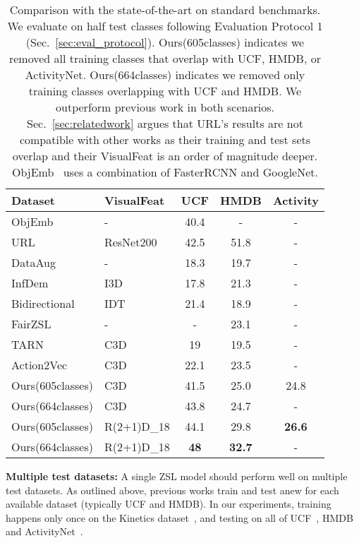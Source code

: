 \documentclass[10pt,twocolumn,letterpaper]{article}
\begin{document}
\begin{table}[t]
    \setlength{\tabcolsep}{2pt}
    \centering
    \begin{tabular}{llccc}  
    \toprule
    Dataset & VisualFeat & UCF & HMDB & Activity \\
    \toprule
    ObjEmb~\cite{mettes2017} & - & 40.4 & - & - \\
    URL~\cite{uar} & ResNet200 & 42.5 & 51.8 & - \\
    \midrule
    DataAug~\cite{xu2016multi} & - & 18.3 & 19.7 & -  \\
    InfDem~\cite{roitberg2018informed} & I3D & 17.8 & 21.3 & - \\
    Bidirectional~\cite{wang2017zero} & IDT & 21.4 & 18.9 & - \\
    FairZSL~\cite{roitberg2018towards} & - & - & 23.1 & - \\
    TARN~\cite{tarn} & C3D & 19 & 19.5 & - \\
    Action2Vec~\cite{action2vec} & C3D & 22.1 & 23.5 & - \\
    \midrule
    Ours(605classes) & C3D & 41.5 & 25.0 & 24.8 \\
    Ours(664classes) & C3D & 43.8 & 24.7 & - \\
    Ours(605classes) & R(2+1)D\_18 &44.1 & 29.8 & \textbf{26.6} \\
    Ours(664classes) & R(2+1)D\_18 & \textbf{48} & \textbf{32.7} & - \\
    \bottomrule
    \end{tabular}
    \caption{Comparison with the state-of-the-art on standard benchmarks. We evaluate on half test classes following Evaluation Protocol 1 (Sec.~\ref{sec:eval_protocol}).
    Ours(605classes) indicates we removed all training classes that overlap with UCF, HMDB, or ActivityNet. Ours(664classes) indicates we removed only training classes overlapping with UCF and HMDB. We outperform previous work in both scenarios. Sec.~\ref{sec:relatedwork} argues that URL's results are not compatible with other works as their training and test sets overlap and their VisualFeat is an order of magnitude deeper. ObjEmb~\cite{mettes2017} uses a combination of FasterRCNN and GoogleNet.}
    \label{tab:sota}
\end{table}

\textbf{Multiple test datasets:} A single ZSL model should perform well on multiple test datasets. As outlined above, previous works train and test anew for each available dataset (typically UCF and HMDB). In our experiments, training happens only once on the Kinetics dataset~\cite{kinetics}, and testing on all of UCF~\cite{ucf}, HMDB~\cite{hmdb} and ActivityNet~\cite{activitynet}.
\end{document}
